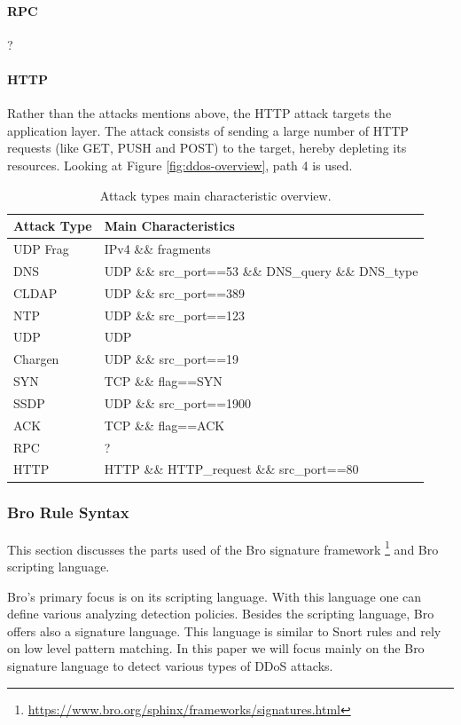 \paragraph{RPC}
?

\paragraph{HTTP}
Rather than the attacks mentions above, the HTTP attack targets the application layer. The attack consists of sending a large number of HTTP requests (like GET, PUSH and POST) to the target, hereby depleting its resources. Looking at Figure \ref{fig:ddos-overview}, path 4 is used.



\begin{table}
\centering
\begin{tabular}{l | l}
Attack Type & Main Characteristics \\ \hline \hline
UDP Frag & IPv4 \&\& fragments \\ \hline
DNS & UDP \&\& src\_port==53 \&\& DNS\_query \&\& DNS\_type \\ \hline
CLDAP & UDP \&\& src\_port==389 \\ \hline
NTP & UDP \&\& src\_port==123 \\ \hline
UDP & UDP \\ \hline
Chargen & UDP \&\& src\_port==19 \\ \hline
SYN & TCP \&\& flag==SYN \\ \hline
SSDP & UDP \&\& src\_port==1900 \\ \hline
ACK & TCP \&\& flag==ACK \\ \hline
RPC & ? \\ \hline
HTTP & HTTP \&\& HTTP\_request \&\& src\_port==80
\end{tabular}
\caption{\label{tab:attack-overview}Attack types main characteristic overview.}
\end{table}


\subsubsection{Bro Rule Syntax} 
This section discusses the parts used of the Bro signature framework \footnote{\url{https://www.bro.org/sphinx/frameworks/signatures.html}} and Bro scripting language. 

Bro's primary focus is on its scripting language. With this language one can define various analyzing detection policies. Besides the scripting language, Bro offers also a signature language. This language is similar to Snort rules and rely on low level pattern matching. In this paper we will focus mainly on the Bro signature language to detect various types of DDoS attacks. 

